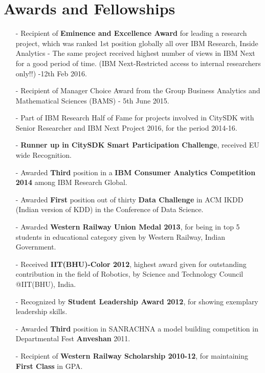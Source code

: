 \documentclass[margin,line]{res}
\begin{document}
\begin{resume}
\begin{itemize}
\end{itemize}
\section{\sc Awards and Fellowships}
\begin{itemize}
\item[-]Recipient of {\bf Eminence and Excellence Award} for leading a research project, which was ranked 1st position globally all over IBM Research, Inside Analytics - The same project received highest number of views in IBM Next for a good period of time. (IBM Next-Restricted access to internal researchers only!!) -12th Feb 2016.
\item[-]Recipient of Manager Choice Award from the Group Business Analytics and Mathematical Sciences (BAMS) - 5th June 2015.
\item[-]Part of IBM Research Half of Fame for projects involved in CitySDK with Senior Researcher and IBM Next Project 2016, for the period 2014-16.
\item[-]{\bf Runner up in CitySDK Smart Participation Challenge}, received EU wide Recognition.
\item[-]Awarded {\bf Third} position in a {\bf IBM Consumer Analytics Competition 2014} among IBM Research Global.
\item[-]Awarded {\bf First} position out of thirty {\bf Data Challenge} in ACM IKDD (Indian version of KDD) in the Conference of Data Science.
\item[-]Awarded {\bf Western Railway Union Medal 2013}, for being in top 5 students in educational category given by Western Railway, Indian Government.
\item[-]Received {\bf IIT(BHU)-Color 2012}, highest award given for outstanding contribution in the field of Robotics, by Science and Technology Council @IIT(BHU), India. %
\item[-]Recognized by {\bf Student Leadership Award 2012}, for showing exemplary leadership skills. %
\item[-]Awarded {\bf Third} position in SANRACHNA a model building competition in Departmental Fest {\bf Anveshan} 2011.
\item[-]Recipient of {\bf Western Railway Scholarship 2010-12}, for maintaining {\bf First Class} in GPA.
\end{itemize}


\end{resume}
\end{document}
